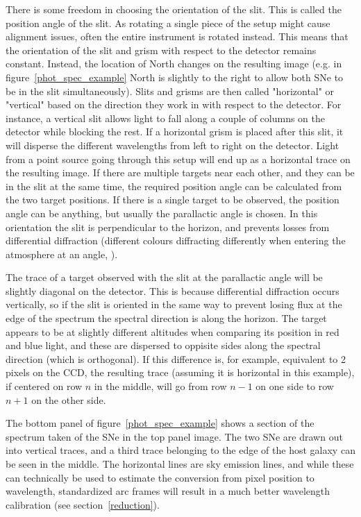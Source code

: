\documentclass[a4paper,oneside,12pt, class=Latex/Classes/PhDthesisPSnPDF, crop=false]{standalone}
\begin{document}
There is some freedom in choosing the orientation of the slit. This is called the position angle of the slit. As rotating a single piece of the setup might cause alignment issues, often the entire instrument is rotated instead. This means that the orientation of the slit and grism with respect to the detector remains constant. Instead, the location of North changes on the resulting image (e.g. in figure~\ref{phot_spec_example} North is slightly to the right to allow both SNe to be in the slit simultaneously). Slits and grisms are then called "horizontal" or "vertical" based on the direction they work in with respect to the detector. For instance, a vertical slit allows light to fall along a couple of columns on the detector while blocking the rest. If a horizontal grism is placed after this slit, it will disperse the different wavelengths from left to right on the detector. Light from a point source going through this setup will end up as a horizontal trace on the resulting image. If there are multiple targets near each other, and they can be in the slit at the same time, the required position angle can be calculated from the two target positions. If there is a single target to be observed, the position angle can be anything, but usually the parallactic angle is chosen. In this orientation the slit is perpendicular to the horizon, and prevents losses from differential diffraction (different colours diffracting differently when entering the atmosphere at an angle, \citealt{diff_refrac_atmosphere}).

The trace of a target observed with the slit at the parallactic angle will be slightly diagonal on the detector. This is because differential diffraction occurs vertically, so if the slit is oriented in the same way to prevent losing flux at the edge of the spectrum the spectral direction is along the horizon. The target appears to be at slightly different altitudes when comparing its position in red and blue light, and these are dispersed to oppisite sides along the spectral direction (which is orthogonal). If this difference is, for example, equivalent to 2 pixels on the CCD, the resulting trace (assuming it is horizontal in this example), if centered on row $n$ in the middle, will go from row $n-1$ on one side to row $n+1$ on the other side.

The bottom panel of figure~\ref{phot_spec_example} shows a section of the spectrum taken of the SNe in the top panel image. The two SNe are drawn out into vertical traces, and a third trace belonging to the edge of the host galaxy can be seen in the middle. The horizontal lines are sky emission lines, and while these can technically be used to estimate the conversion from pixel position to wavelength, standardized arc frames will result in a much better wavelength calibration (see section~\ref{reduction}).
\end{document}
